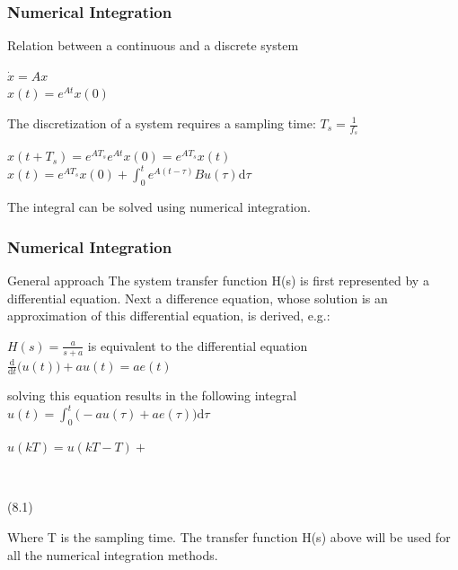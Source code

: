 \begin{frame}
	\frametitle{Numerical Integration}
	\begin{block}{Relation between a continuous and a discrete system}
		\begin{center}
			$\dot{x} = A x$\\
			$x(t) = e^{At} x(0)$
		\end{center}
		The discretization of a system requires a sampling time: $T_s = \frac{1}{f_s}$\\
		\begin{center}
			$x(t + T_s) = e^{AT_s} e^{At} x(0) = e^{AT_s} x(t)$
			$x(t) = e^{AT_s} x(0) + \int_0^t e^{A(t-\tau)} B u(\tau) \mathrm{d}\tau $
		\end{center}
		The integral can be solved using numerical integration.
	\end{block}
\end{frame}

\begin{frame}
	\frametitle{Numerical Integration}
	\begin{block}{General approach}
		The system transfer function H(s) is first represented by a differential equation. Next a difference equation, whose solution is an approximation of this differential equation, is derived, e.g.:
		\vspace{-0.8em}
		\begin{center}
			$H(s) = \frac{a}{s + a}$
			is equivalent to the differential equation
			$\frac{\mathrm d}{\mathrm d t} \big( u(t) \big) + au(t) = ae(t)$
			
			solving this equation results in the following integral
			$u(t) = \int_0^t \big(-au(\tau) + ae(\tau) \big)\mathrm{d}\tau$
			
			$u(kT) = u(kT - T)+ $ 
			\begin{cases}
				\\
			\end{cases}
			(8.1)
		\end{center}
		\vspace{-0.8em}
		Where T is the sampling time. The transfer function H(s) above will be used for all the numerical integration methods.
	\end{block}
\end{frame}

